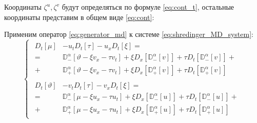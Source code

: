 \documentclass[a4paper, fontsize=14pt]{article}
\newcommand{\MD}[2]{\mathbb{D}_{#1}^{\alpha}[#2]} %
\newcommand{\D}[3]{D_{#1}^{#2} \left[ #3 \right]} %
\begin{document}
Координаты $\zeta^u, \zeta^v$ будут определяться по формуле \eqref{eq:cont_t}, остальные координаты представим в общем виде \eqref{eq:cont}:

Применим оператор \eqref{eq:generator_md} к системе \eqref{eq:shredinger_MD_system}:
\begin{equation}
  \label{eq:def_md}
  \begin{cases}
    \begin{aligned}
      \D{t}{}{\mu} &- u_t \D{t}{}{\tau} - u_x \D{t}{}{\xi}  = \\
      =& \MD{-}{\vartheta  - \xi v_x - \tau v_t } + \xi \D{x}{}{\MD{-}{v}} + \tau \D{t}{}{\MD{-}{v}} +\\
      +& \MD{+}{\vartheta  - \xi v_x - \tau v_t } + \xi \D{x}{}{\MD{+}{v}} + \tau \D{t}{}{\MD{+}{v}}
    \end{aligned} \\
    \begin{aligned}
      \D{t}{}{\vartheta } & - v_t \D{t}{}{\tau} - v_x \D{t}{}{\xi}  = \\
      =& \MD{-}{\mu - \xi u_x - \tau u_t } + \xi \D{x}{}{\MD{-}{u}} + \tau \D{t}{}{\MD{-}{u}} +\\
      +& \MD{+}{\mu  - \xi u_x - \tau u_t } + \xi \D{x}{}{\MD{+}{u}} + \tau \D{t}{}{\MD{+}{u}}
    \end{aligned} 
  \end{cases}
\end{equation}
\end{document}
